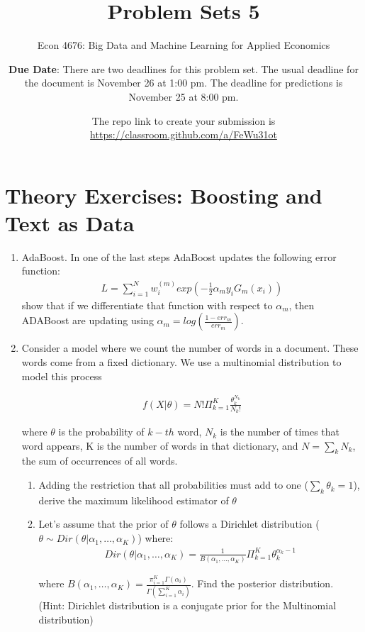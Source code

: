 \documentclass[12pt,onecolumn]{article}
\title{Problem Sets 5}
\subtitle{Econ 4676: Big Data and Machine Learning for Applied Economics}
\author{{\bf Due Date}: There are two deadlines for this problem set. The usual deadline for the document is November 26 at 1:00 pm. The deadline for predictions is November 25 at 8:00 pm. }
\date{}
\date{The repo link to create your submission is \url{https://classroom.github.com/a/FeWu31ot}}
\begin{document}
\maketitle

\section{Theory Exercises: Boosting and Text as Data}

\begin{enumerate}
  \item AdaBoost. In one of the last steps AdaBoost updates the following error function:
   \begin{align}
   L=\sum_{i=1}^N w^{(m)}_i exp\left(-\frac{1}{2}\alpha_m y_i G_m(x_i)\right)
   \end{align}
 show that if we differentiate that function with respect to $\alpha_m$, then ADABoost are updating using $\alpha_m=log(\frac{1-err_m}{err_m})$. 

\item Consider a model where we count the number of words in a document. These words come from a fixed dictionary. We use a multinomial distribution to model this process

\begin{align}
f(X|\theta) = N! \Pi_{k=1}^K \frac{\theta_k^{N_k}}{N_k!}
\end{align}

where $\theta$ is the probability of $k-th$ word, $N_k$ is the number of times that word appears, K is the number of words in that dictionary, and $N=\sum_k N_k$, the sum of occurrences of all words.

\begin{enumerate}
  \item Adding the restriction that all probabilities must add to one ($\sum_k\theta_k=1$), derive the maximum likelihood estimator of $\theta$
  \item Let's assume that the prior of $\theta$ follows a Dirichlet distribution ($\theta\sim Dir(\theta|\alpha _{1},\ldots ,\alpha _{K})$) where:
  \begin{align}
    Dir(\theta|\alpha _{1},\ldots ,\alpha _{K}) =\frac{1}{B(\alpha _{1},\ldots ,\alpha _{K})} \Pi_{k=1}^K \theta_k^{\alpha_k-1}
  \end{align}

 where $ B(\alpha _{1},\ldots ,\alpha _{K})=\frac{\pi _{i=1}^{K} \Gamma(\alpha _{i})}{\Gamma \left(\sum _{i=1}^{K}\alpha _{i}\right)}$. Find the posterior distribution. (Hint: Dirichlet distribution is a conjugate prior for the Multinomial distribution)


\end{enumerate}
\end{enumerate}
\end{document}
